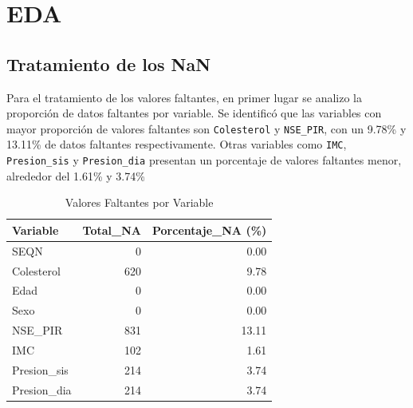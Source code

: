 \section{EDA}

\subsection{Tratamiento de los NaN}
Para el tratamiento de los valores faltantes, en primer lugar se analizo la proporción de datos faltantes por variable. Se identificó que las variables con mayor proporción de valores faltantes son \texttt{Colesterol} y \texttt{NSE\_PIR}, con un 9.78\% y 13.11\% de datos faltantes respectivamente. Otras variables como \texttt{IMC},
\texttt{Presion\_sis} y \texttt{Presion\_dia} presentan un porcentaje de valores faltantes menor, alrededor del 1.61\% y 3.74\%

\begin{table}[h]
\centering
\caption{Valores Faltantes por Variable}
\begin{tabular}{lrr}
\hline
\textbf{Variable} & \textbf{Total\_NA} & \textbf{Porcentaje\_NA (\%)} \\
\hline
SEQN          &   0 &  0.00 \\
Colesterol    & 620 &  9.78 \\
Edad          &   0 &  0.00 \\
Sexo          &   0 &  0.00 \\
NSE\_PIR      & 831 & 13.11 \\
IMC           & 102 &  1.61 \\
Presion\_sis  & 214 &  3.74 \\
Presion\_dia  & 214 &  3.74 \\
\hline
\end{tabular}
\label{tab:missing_values}
\end{table}

